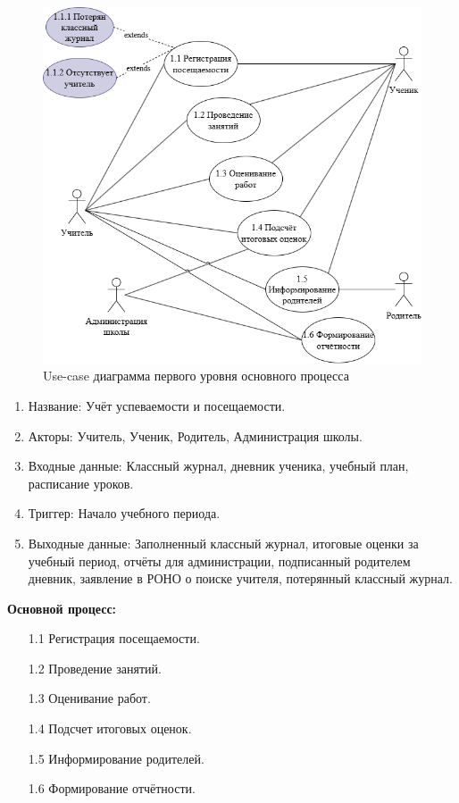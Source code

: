 \documentclass[a4paper, final]{article}
\begin{document}
\begin{figure}[H]
  \centering
  \includegraphics[width=0.9\linewidth]{use_case1.png}
  \caption{Use-case диаграмма первого уровня основного процесса}
  \label{img:use_case1}
\end{figure}

\begin{enumerate}
  \item Название: Учёт успеваемости и посещаемости.
  \item Акторы: Учитель, Ученик, Родитель, Администрация школы.
  \item Входные данные: Классный журнал, дневник ученика, учебный план, расписание уроков.
  \item Триггер: Начало учебного периода.
  \item Выходные данные: Заполненный классный журнал, итоговые оценки за учебный период, отчёты для администрации, подписанный родителем дневник, заявление в РОНО о поиске учителя, потерянный классный журнал.
\end{enumerate}

\textbf{Основной процесс:}
\begin{enumerate}
  \item[1.1] Регистрация посещаемости.
  \item[1.2] Проведение занятий.
  \item[1.3] Оценивание работ.
  \item[1.4] Подсчет итоговых оценок.
  \item[1.5] Информирование родителей.
  \item[1.6] Формирование отчётности.
\end{enumerate}
\end{document}
